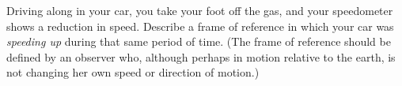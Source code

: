  Driving along in your car, you take your foot off the
gas, and your speedometer shows a reduction in speed.
Describe a frame of reference in which your car was
\emph{speeding up} during that same period of time. (The
frame of reference should be defined by an observer who,
although perhaps in motion relative to the earth, is not
changing her own speed or direction of motion.)
